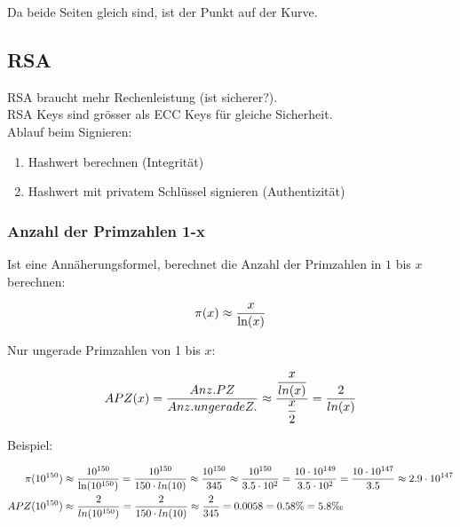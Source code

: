 \documentclass[12pt]{scrartcl}
\begin{document}
Da beide Seiten gleich sind, ist der Punkt auf der Kurve.



\newpage
\subsection{RSA}

RSA braucht mehr Rechenleistung (ist sicherer?).\\

RSA Keys sind grösser als ECC Keys für gleiche Sicherheit.\\

Ablauf beim Signieren: 

\begin{enumerate}
    \item Hashwert berechnen (Integrität)
    \item Hashwert mit privatem Schlüssel signieren (Authentizität)
\end{enumerate}


\subsubsection{Anzahl der Primzahlen 1-x}

Ist eine Annäherungsformel, berechnet die Anzahl der Primzahlen in $1$ bis $x$ berechnen:

\begin{equation*}
    \pi(x) \approx \frac{x}{\ln(x)} \\
\end{equation*}

Nur ungerade Primzahlen von 1 bis $x$:

\begin{equation*}
    APZ(x) = \frac{Anz. PZ}{Anz. ungerade Z.} \approx \frac{\displaystyle{\frac{x}{ln(x)}}}{ \displaystyle{\frac{x}{2} }} = \frac{2}{ln(x)}\\
\end{equation*}


Beispiel:

\begin{align*}
    \pi(10^{150}) &\approx \frac{10^{150}}{\ln(10^{150})} = \frac{10^{150}}{150 \cdot ln(10)} 
    \approx \frac{10^{150}}{345} \approx \frac{10^{150}}{3.5 \cdot 10^2} = \frac{10 \cdot 10^{149}}{3.5 \cdot 10^2}
    = \frac{10 \cdot 10^{147}}{3.5} \approx 2.9 \cdot 10^{147} \\
    APZ(10^{150}) &\approx \frac{2}{ln(10^{150})} = \frac{2}{150 \cdot ln(10)} \approx \frac{2}{345} = 0.0058 = 0.58\% = 5.8 \text{\textperthousand} \\
\end{align*}
\end{document}
